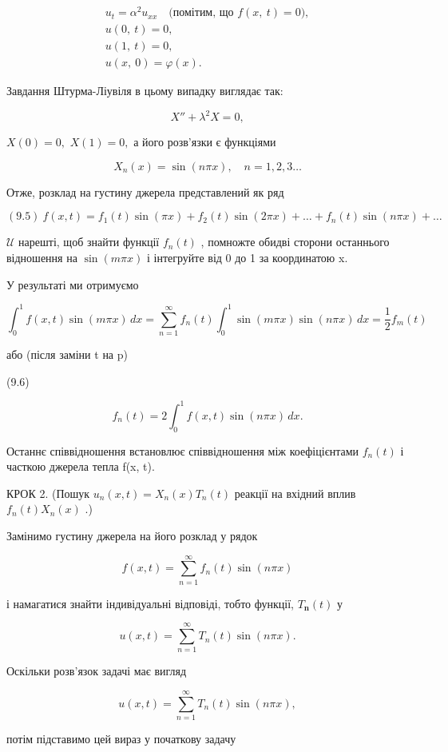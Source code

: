 \[
\begin{array}{c} u_t = \alpha^2 u_{xx} \quad \text{(помітим, що } f(x, \ t) = 0), \\ u(0, \ t) = 0, \\ u(1, \ t) = 0, \\ u(x, \ 0) = \varphi(x). \end{array}
\]

Завдання Штурма-Ліувіля в цьому випадку виглядає так:

\[
X'' + \lambda^2 X = 0,
\]

\(X(0) = 0,\) \(X(1) = 0,\) а його розв'язки є функціями

\[
X_n(x) = \sin(n\pi x), \quad n = 1, 2, 3 \dots
\]

Отже, розклад на густину джерела представлений як ряд

\[
(9.5) \ f(x,t) = f_1(t) \sin(\pi x) + f_2(t) \sin(2\pi x) + \dots + f_n(t) \sin(n\pi x) + \dots
\]

\(\mathcal{U}\) нарешті, щоб знайти функції \(f_n(t)\) , помножте обидві сторони останнього відношення на \(\sin(m\pi x)\) і інтегруйте від 0 до 1 за координатою x.

У результаті ми отримуємо

\[
\int_{0}^{1} f(x, t) \sin(m\pi x)\,dx = \sum_{n=1}^{\infty} f_{n}(t) \int_{0}^{1} \sin(m\pi x) \sin(n\pi x)\,dx = \frac{1}{2} f_{m}(t)
\]

або (після заміни t на p)

(9.6)

\[
f_{n}(t) = 2 \int_{0}^{1} f(x, t) \sin(n\pi x)\,dx.
\]

Останнє співвідношення встановлює співвідношення між коефіцієнтами \(f_n(t)\) і часткою джерела тепла f(x, t).

КРОК 2. (Пошук \(u_n(x, t) = X_n(x) T_n(t)\) реакції на вхідний вплив \(f_n(t) X_n(x)\) .)

Замінимо густину джерела на його розклад у рядок

\[f(x, t) = \sum_{n=1}^{\infty} f_n(t) \sin(n\pi x)\]

і намагатися знайти індивідуальні відповіді, тобто функції, \(T_{\mathbf{n}}(t)\) у

\[u(x, t) = \sum_{n=1}^{\infty} T_n(t) \sin(n\pi x).\]

Оскільки розв'язок задачі має вигляд

\[u(x, t) = \sum_{n=1}^{\infty} T_n(t) \sin(n\pi x),\]

потім підставимо цей вираз у початкову задачу

